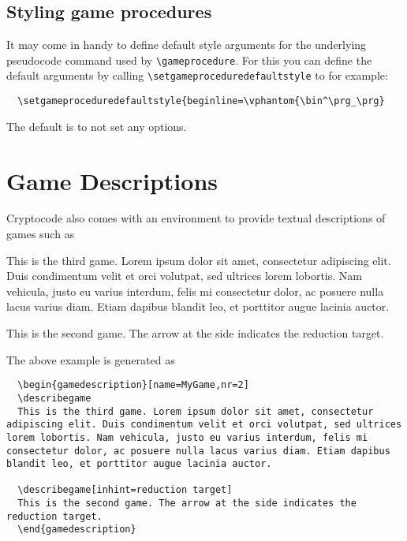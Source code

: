 \documentclass[a4paper]{report}
\begin{document}
  \subsection{Styling game procedures}
  It may come in handy to define default style arguments for the underlying pseudocode 
  command used by \lstinline$\gameprocedure$. For this you can
  define the default arguments by calling \lstinline{\setgameproceduredefaultstyle} to 
  for example:
  
  \begin{lstlisting}
  \setgameproceduredefaultstyle{beginline=\vphantom{\bin^\prg_\prg}
  \end{lstlisting}
  
  The default is to not set any options.
  
  \section{Game Descriptions}
  Cryptocode also comes with an environment to provide textual descriptions of games such as
  
  
   \begin{gamedescription}[name=MyGame,nr=2]
  \describegame
   This is the third game. Lorem ipsum dolor sit amet, consectetur adipiscing elit. Duis condimentum velit et orci volutpat, sed ultrices lorem lobortis. Nam vehicula, justo eu varius interdum, felis mi consectetur dolor, ac posuere nulla lacus varius diam. Etiam dapibus blandit leo, et porttitor augue lacinia auctor.
  
  \describegame[inhint=reduction target]
   This is the second game. The arrow at the side indicates the reduction target.
   \end{gamedescription}
   
   The above example is generated as
   
  \begin{lstlisting}
  \begin{gamedescription}[name=MyGame,nr=2]
  \describegame
  This is the third game. Lorem ipsum dolor sit amet, consectetur adipiscing elit. Duis condimentum velit et orci volutpat, sed ultrices lorem lobortis. Nam vehicula, justo eu varius interdum, felis mi consectetur dolor, ac posuere nulla lacus varius diam. Etiam dapibus blandit leo, et porttitor augue lacinia auctor.
  
  \describegame[inhint=reduction target]
  This is the second game. The arrow at the side indicates the reduction target.
  \end{gamedescription}
  \end{lstlisting}
  
\end{document}
